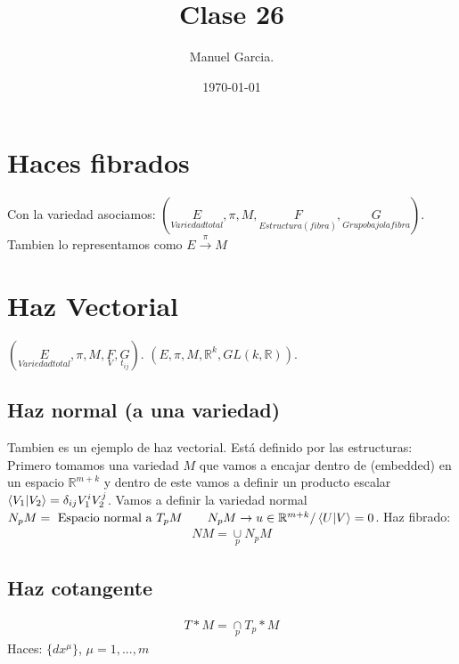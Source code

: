 \documentclass{article}
\title{Clase 26 }
\author{Manuel Garcia.}
\date{\today}
\begin{document}
\maketitle

\section{Haces fibrados }
Con la variedad asociamos: $(\underset{Variedad total }{E }, \pi, M, \underset{Estructura (fibra) }{F },\underset{Grupo bajo la fibra }{G })$. Tambien lo representamos como $ E \overset{\pi }{\rightarrow }M  $
\section{Haz Vectorial }
$(\underset{Variedad total }{E }, \pi, M, \underset{V }{F },\underset{t _{ij } }{G })$. $(E , \pi, M, \mathbb{R}^ {k },GL(k, \mathbb{R}))$.
\subsection{Haz normal (a una variedad)}
Tambien es un ejemplo de haz vectorial. Está definido por las estructuras: Primero tomamos una variedad $ M  $ que vamos a encajar dentro de (embedded) en un espacio $ \mathbb{R}^ {m+k } $ y dentro de este vamos a definir un producto escalar $ \bra{V_1 }\ket{V_2 } = \delta _{ij } V _{1 } ^ {i } V _{2 } ^ {j }  $. Vamos a definir la variedad normal $ N _{p } M = \text{ Espacio normal a }T _{p } M \qquad N_p M \rightarrow u \in \mathbb{R}^ {m+k } / \bra{U}\ket{V } = 0 $. Haz fibrado: 
\begin{gather*}
  NM = \underset{p }{\cup }N _{p } M  
\end{gather*}
\subsection{Haz cotangente }
\begin{gather*}
  T* M = \underset{p }{\cap }T _{p } * M  
\end{gather*}
Haces: $ \{dx ^ {\mu  }\} $, $ \mu = 1,...,m  $
\end{document}

